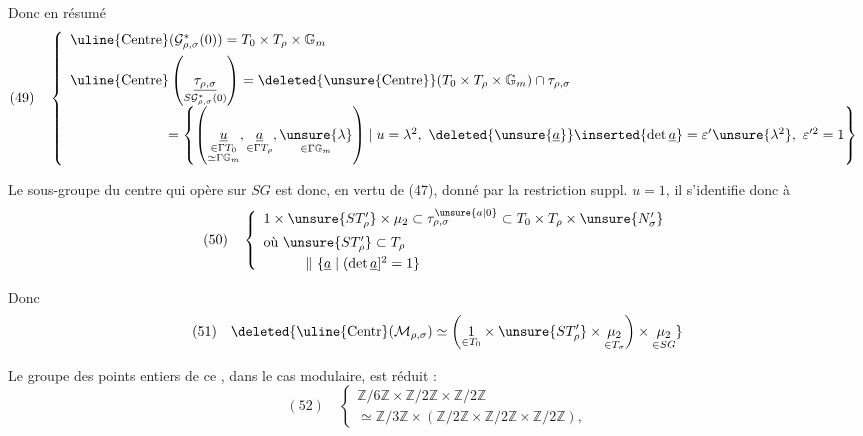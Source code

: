 

Donc en résumé
\[
(49)\quad
\left\{
\begin{array}{l}
\uline{\mathrm{Centre}}(\mathcal G^*_{\rho,\sigma}(0))=T_0\times T_\rho\times\mathbb G_m\\[5pt]
\uline{\mathrm{Centre}}\left(\underset{S\mathcal G^*_{\rho,\sigma}(0)}{\underline{\tau_{\rho,\sigma}}}\right)
=\deleted{\unsure{\mathrm{Centre}}}(T_0\times T_\rho\times\mathbb G_m)\cap\tau_{\rho,\sigma}\\[7pt]
\hspace{7em}=\left\{\left(
\underset{\substack{\in\Gamma T_0\\\simeq\Gamma\mathbb G_m}}{\underline u},
\underset{\in\Gamma T_\rho}{\underline a},
\underset{\in\Gamma\mathbb G_m}{\unsure{\lambda}}
\right)\mid u=\lambda^2,\ \deleted{\unsure{\underline a}}\inserted{\det\underline a}=\varepsilon'\unsure{\lambda^2},\ \varepsilon'^2=1\right\}
\end{array}\right.
\]

Le sous-groupe du centre qui opère  sur $SG$ est donc, en vertu de (47), donné par la restriction suppl. $u=1$, il s'identifie donc à 
\[
(50)\quad
\left\{
\begin{array}{l}
1\times\unsure{ST'_\rho}\times\mu_2\subset\tau^{\unsure{a|0}}_{\rho,\sigma}\subset T_0\times T_\rho\times\unsure{N'_\sigma}\\[5pt]
\text{où }\unsure{ST'_\rho}\subset T_\rho\\[3pt]
\hspace{3em}\Vert\ \{\underline a\mid(\det\underline a]^2=1\}
\end{array}\right.
\]

Donc
\[
(51)\quad
\deleted{\uline{\mathrm{Centr}}(\mathcal M_{\rho,\sigma})\simeq
\left(\underset{\in T_0}{1}\times\unsure{ST'_\rho}\times\underset{\in T_\sigma}{\mu_2}\right)\times\underset{\in SG}{\mu_2}}
\]

Le groupe des points entiers de ce , dans le cas modulaire, est réduit :
\[
(52)\quad
\left\{
\begin{array}{l}
\mathbb Z/6\mathbb Z\times\mathbb Z/2\mathbb Z\times\mathbb Z/2\mathbb Z\\[4pt]
\simeq\mathbb Z/3\mathbb Z\times(\mathbb Z/2\mathbb Z\times\mathbb Z/2\mathbb Z\times\mathbb Z/2\mathbb Z),
\end{array}\right.
\]

